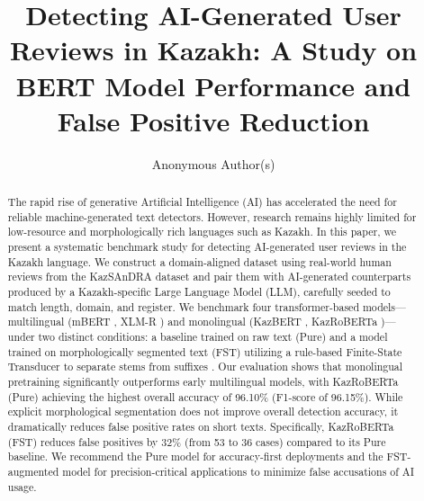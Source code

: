 \documentclass[runningheads]{llncs}
\begin{document}
\sloppy

\title{Detecting AI-Generated User Reviews in Kazakh: A Study on BERT Model Performance and False Positive Reduction}

\author{Anonymous Author(s)}


\maketitle

\begin{abstract}
The rapid rise of generative Artificial Intelligence (AI) has accelerated the need for reliable machine-generated text detectors. However, research remains highly limited for low-resource and morphologically rich languages such as Kazakh. In this paper, we present a systematic benchmark study for detecting AI-generated user reviews in the Kazakh language. We construct a domain-aligned dataset using real-world human reviews from the KazSAnDRA dataset \cite{1} and pair them with AI-generated counterparts produced by a Kazakh-specific Large Language Model (LLM), carefully seeded to match length, domain, and register.
We benchmark four transformer-based models---multilingual (mBERT \cite{2}, XLM-R \cite{3}) and monolingual (KazBERT \cite{4}, KazRoBERTa \cite{5})---under two distinct conditions: a baseline trained on raw text (Pure) and a model trained on morphologically segmented text (FST) utilizing a rule-based Finite-State Transducer to separate stems from suffixes \cite{6}. Our evaluation shows that monolingual pretraining significantly outperforms early multilingual models, with KazRoBERTa (Pure) achieving the highest overall accuracy of 96.10\% (F1-score of 96.15\%). While explicit morphological segmentation does not improve overall detection accuracy, it dramatically reduces false positive rates on short texts. Specifically, KazRoBERTa (FST) reduces false positives by 32\% (from 53 to 36 cases) compared to its Pure baseline. We recommend the Pure model for accuracy-first deployments and the FST-augmented model for precision-critical applications to minimize false accusations of AI usage.
\end{abstract}
\end{document}

